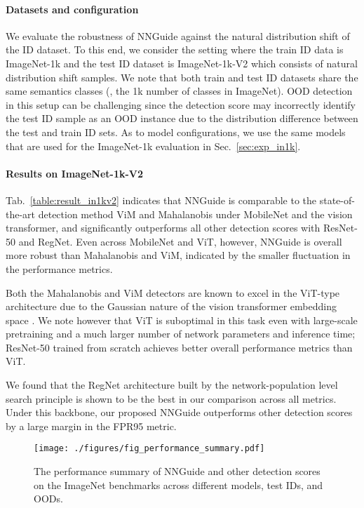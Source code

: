 \documentclass[10pt,twocolumn,letterpaper]{article}
\begin{document}
\paragraph{Datasets and configuration}


We evaluate the robustness of NNGuide against the natural distribution shift of the ID dataset. To this end, we consider the setting where the train ID data is ImageNet-1k and the test ID dataset is ImageNet-1k-V2 which consists of natural distribution shift samples. We note that both train and test ID datasets share the same semantics classes (\ie, the 1k number of classes in ImageNet). OOD detection in this setup can be challenging since the detection score may incorrectly identify the test ID sample as an OOD instance due to the distribution difference between the test and train ID sets. 
As to model configurations, we use the same models that are used for the ImageNet-1k evaluation in Sec.~\ref{sec:exp_in1k}.

\paragraph{Results on ImageNet-1k-V2}

Tab.~\ref{table:result_in1kv2} indicates that NNGuide is comparable to the state-of-the-art detection method ViM and Mahalanobis under MobileNet and the vision transformer, and significantly outperforms all other detection scores with ResNet-50 and RegNet. Even across MobileNet and ViT, however, NNGuide is overall more robust than Mahalanobis and ViM, indicated by the smaller fluctuation in the performance metrics. 

Both the Mahalanobis and ViM detectors are known to excel in the ViT-type architecture due to the Gaussian nature of  the vision transformer embedding space \cite{fort2021exploring,koner2021oodformer}.   We note however that ViT is suboptimal in this task even with large-scale pretraining and a much larger number of network parameters and inference time; ResNet-50 trained from scratch achieves better overall performance metrics than ViT. 

We found that the RegNet architecture built by the network-population level search principle is shown to be the best in our comparison across all metrics. Under this backbone, our proposed NNGuide outperforms other detection scores by a large margin in the FPR95 metric. 

\begin{figure}[t]
\centering
\texttt{[image: ./figures/fig\_performance\_summary.pdf]}
\caption{
The performance summary of NNGuide and other detection scores on the ImageNet benchmarks across different models, test IDs, and OODs.
}
\label{fig:performance_summary}
\end{figure}
\end{document}
